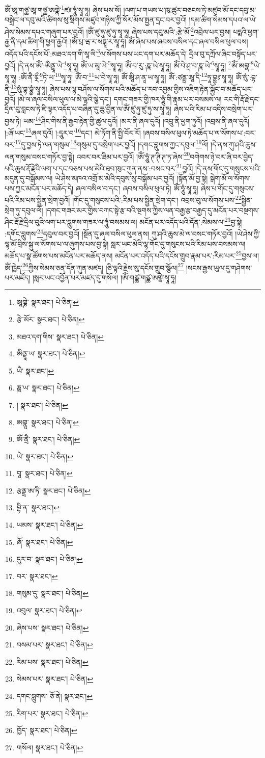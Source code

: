 ཨོཾ་ཨཱ་གཙྪ་ཨཱ་གཙྪ་ཨགྣེ་\footnote{ཨཱགྞེ་  སྣར་ཐང་།  པེ་ཅིན། }ཛཿ་ཧཱུཾ་སྭཱ་ཧཱ། ཞེས་པས་སོ། །ལག་པ་གཡས་པ་ཁུ་ཚུར་བཅངས་ཏེ་མཛུབ་མོ་དང་དབུ་མ་བསྒྲེང་ལ་དབུ་མའི་ཚིགས་སུ་སྡིགས་མཛུབ་གཉིས་ཀྱི་སོར་མོས་སྤྱན་དྲང་བར་བྱའོ། །དམ་ཚིག་སེམས་དཔའ་ལ་ཡེ་ཤེས་སེམས་དཔའ་གཞུག་པར་བྱའོ། །ཨོཾ་ཛུ་ཧུ་ཛུ་ཧུ་སྭཱ་ཧཱ། ཞེས་པས་དབུ་མའི་:རྩེ་མོ་\footnote{རྩེ་མོར་  སྣར་ཐང་།  པེ་ཅིན། }འབྲེལ་པར་བྱས། པདྨའི་ཕྱག་རྒྱ་ནི་དམ་ཚིག་གི་ཕྱག་རྒྱའོ། །ཨོཾ་པྲ་ཝ་ར་སཏྐཱ་ར་སྭཱ་ཧཱ། ཨོཾ་ཞེས་པས་ཞབས་བསིལ་དང་ཞལ་བསིལ་ཕུལ་བས། འདོད་པའི་དངོས་པོ་:མཐའ་དག་གི་སཱ་ལི་\footnote{མཐའ་དག་གིས་  སྣར་ཐང་།  པེ་ཅིན། }ལ་སོགས་པས་ཡང་དག་པར་མཆོད་དེ། དྲིལ་བུ་དཀྲོལ་ཞིང་བསྟོད་པར་བྱའོ། །དེ་ནས་ཨོཾ་:ཨིནྡྲཱ་ཡེ་\footnote{ཨིནྡཱ་ཡ་  སྣར་ཐང་།  པེ་ཅིན། }སྭཱ་ཧཱ། ཨོཾ་ཡ་མཱ་ཡེ་\footnote{ཡཻ་  སྣར་ཐང་། }སྭཱ་ཧཱ། ཨོཾ་བ་རུ་:ཎཱ་ཡེ་སྭཱ་ཧཱ། ཨོཾ་བེ་ཤྲ་བ་ཎཱ་ཡེ་\footnote{ཎཱ་ཡ་  སྣར་ཐང་།  པེ་ཅིན། }སྭཱ་ཧཱ། \footnote{།    སྣར་ཐང་།  པེ་ཅིན། }ཨོཾ་ཨགྣ་\footnote{ཨགྣཱ་  སྣར་ཐང་།  པེ་ཅིན། }ཡེ་སྭཱ་ཧཱ། :ཨོཾ་ནཻ་ཪྼྀ་\footnote{ཨོཾ་ནྲཻ་  སྣར་ཐང་།  པེ་ཅིན། }ཏེ་ཡ་\footnote{ཡེ་  སྣར་ཐང་།  པེ་ཅིན། }སྭཱ་ཧཱ། ཨོཾ་བ་\footnote{བཱ་  སྣར་ཐང་།  པེ་ཅིན། }ཡ་བེ་སྭཱ་ཧཱ། ཨོཾ་ཨཱི་ཤ་ནཱ་ཡ་སྭཱ་ཧཱ། ཨོཾ་:ཙནྡྲ་ཨཱ་དི་\footnote{རྩནྡྲ་ཨ་ཏི་  སྣར་ཐང་།  པེ་ཅིན། }ཏཱ་བྷྱཿ་སྭཱ་ཧཱ། ཨོཾ་སུཾ་:བྷ་ནི་\footnote{བྷི་ན་  སྣར་ཐང་། }སུཾ་བྷ་བྷྱཾ་སྭཱ་ཧཱ། ཞེས་པས་ལྷ་བཤོས་ལ་སོགས་པའི་མཆོད་པ་རབ་འབྱམ་གྱིས་འཇིག་རྟེན་སྐྱོང་བ་མཆོད་པར་བྱའོ། །མེ་ལ་ཞལ་བསིལ་ཕུལ་ལ་མེ་ལྷའི་ལྕེ་དང་། དགང་གཟར་གྱི་ཁར་ཧཱུཾ་གི་རྣམ་པར་བསམས་ལ། རང་གི་རྡོ་རྗེ་དང་དྲིལ་བུ་བླངས་ཏེ་ཇི་ལྟར་འདོད་པ་བཞིན་དུ་ཆུ་བྱིན་ལ་ཨོཾ་ཛུ་ཧུ་ཛུ་ཧུ་ས་སྭཱ་ཧཱ། ཞེས་པའི་རིམ་པ་འདིས་བསྲེག་པར་བྱས་ཏེ། ཡམ་\footnote{ཡམས་  སྣར་ཐང་།  པེ་ཅིན། }ཤིང་གིས་ནི་རྒྱབ་རྟེན་གྱི་ཚུལ་དུའོ། །མར་ནི་ཞལ་དུའོ། །འབྲུ་ནི་ཕྱག་ཏུའོ། །འབྲས་ནི་ཞལ་དུའོ། །:ཞོ་ཡང་\footnote{ཞོ་  སྣར་ཐང་།  པེ་ཅིན། }ཞལ་དུའོ། །:དཱུར་བ་\footnote{དུར་བ་  སྣར་ཐང་།  པེ་ཅིན། }དང་། མེ་ཏོག་ནི་སྤྱི་བོར་རོ། །ཞབས་བསིལ་ཕུལ་ཏེ་མཆོད་པ་ལ་སོགས་པ་:བར་བར་\footnote{བར་  སྣར་ཐང་། }དུ་བྱས་ཏེ་ལན་གསུམ་\footnote{གསུམ་དུ་  སྣར་ཐང་།  པེ་ཅིན། }གསུམ་དུ་བསྲེག་པར་བྱའོ། །དགང་བླུགས་ཀྱང་དབུལ་\footnote{འབུལ་  སྣར་ཐང་།  པེ་ཅིན། }ལོ། །དེ་ནས་ཀུ་ཤའི་ཆུས་ལན་གསུམ་བསང་གཏོར་བྱ་སྟེ། འབར་བར་ཐིམ་པར་བྱའོ། །ཨོཾ་ཧཱུཾ་ཊ་ཊི་ཊ་ཏ་ཞེས་\footnote{ཞེས་པས་  སྣར་ཐང་།  པེ་ཅིན། }བགེགས་ཉེ་བར་ཞི་བར་བྱེད་པའི་ཆུས་རྡོ་རྗེའི་ལག་པ་དང་བཅས་པས་མེའི་ཐབ་ཁུང་ཀུན་ནས་:བསང་བར་\footnote{བསམ་པར་  སྣར་ཐང་།  པེ་ཅིན། }བྱའོ། །དེ་ནས་གོང་དུ་གསུངས་པའི་མདུན་དུ་བསྒོམས་ལ། ཡེ་ཤེས་མཁའ་འགྲོ་མ་མེའི་དབུས་སུ་བསྒོམ་པར་བྱའོ། །སྟོན་མོ་བྱ་སྟེ། སྒེག་མོ་ལ་སོགས་པས་ཀྱང་མངོན་པར་མཆོད་དེ། ཞལ་བསིལ་བ་དང་། ཞབས་བསིལ་ཕུལ་ཏེ། ཨོཾ་ཧཱུཾ་སྭཱ་ཧཱ། ཞེས་པ་གོང་དུ་གསུངས་པའི་རིམ་པས་སྦྱིན་སྲེག་བྱའོ། །གོང་དུ་གསུངས་པའི་:རིམ་པས་སྦྱིན་སྲེག་དང་། འབྲས་བུ་ལ་སོགས་པས་\footnote{རིམ་པས་  སྣར་ཐང་།  པེ་ཅིན། }སྦྱིན་སྲེག་ཏུ་དབུལ་ལོ། །དགང་གཟར་མར་གྱིས་བཀང་སྟེ་རྩ་བའི་སྔགས་ཀྱིས་ལན་བརྒྱ་རྩ་བརྒྱད་དུ་མངོན་པར་བསྔགས་ཤིང་རྡོ་རྗེ་དྲིལ་བུའི་ལག་པར་བླུགས་གཟར་ལ་ཧཱུཾ་བསམས་ལ། མངོན་པར་འདོད་པའི་དོན་:སེམས་ལ་\footnote{སེམས་པར་  སྣར་ཐང་།  པེ་ཅིན། }བྱ་སྟེ། :དགོང་བླུགས་\footnote{དགང་བླུགས་  ཅོ་ནེ།  སྣར་ཐང་། }དབུལ་བར་བྱའོ། །སྔོན་དུ་ཞལ་བསིལ་ཕུལ་ནས། ཀུ་ཤའི་ཆུས་མེ་ལ་བསང་གཏོར་བྱའོ། །ཡེ་ཤེས་ཀྱི་ལྷ་མོ་བྲིས་སྐུ་ལ་སོགས་པ་ལ་ཞུགས་པས་བྱ་སྟེ། སླར་ཡང་མེའི་ལྷ་གོང་དུ་གསུངས་པའི་རིམ་པས་བསམས་ལ། མཆོད་པ་སྣ་ཚོགས་པས་མངོན་པར་མཆོད་ནས། མངོན་པར་འདོད་པའི་དངོས་གྲུབ་རྣམ་པར་:རིམ་པར་\footnote{རིག་པར་  སྣར་ཐང་།  པེ་ཅིན། }བྱས་ལ། ཨོཾ་ཁྱེད་\footnote{ཁྱོད་  སྣར་ཐང་།  པེ་ཅིན། }ཀྱིས་སེམས་ཅན་དོན་ཀུན་མཛད། །ཅི་ལྟའི་རྗེས་སུ་དངོས་གྲུབ་སྩོལ།\footnote{གསོལ།  སྣར་ཐང་།  པེ་ཅིན། } །སངས་རྒྱས་ཡུལ་དུ་གཤེགས་པར་མཛོད། །སླར་ཡང་འབྱོན་པར་མཛད་དུ་གསོལ། །ཨོཾ་གཙྪ་གཙྪ་ཨགྣེ་སྭཱ་ཧཱ། 